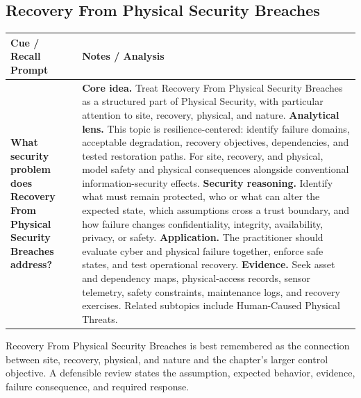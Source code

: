 \documentclass[11pt]{article}
\newcommand{\CornellHeader}{%
\rowcolor{Navy}\color{white}\bfseries Cue / Recall Prompt & \color{white}\bfseries Notes / Analysis\\\hline}
\newcommand{\CornellRow}[2]{%
\cellcolor{CueGray}\RaggedRight\textbf{#1} & \RaggedRight #2\\\hline}
\begin{document}
\subsection*{Recovery From Physical Security Breaches}
\begin{longtable}{>{\RaggedRight\arraybackslash}p{}|>{\RaggedRight\arraybackslash}p{}}
\CornellHeader
\CornellRow{What security problem does Recovery From Physical Security Breaches address?}{\textbf{Core idea.} Treat Recovery From Physical Security Breaches as a structured part of Physical Security, with particular attention to site, recovery, physical, and nature. \textbf{Analytical lens.} This topic is resilience-centered: identify failure domains, acceptable degradation, recovery objectives, dependencies, and tested restoration paths. For site, recovery, and physical, model safety and physical consequences alongside conventional information-security effects. \textbf{Security reasoning.} Identify what must remain protected, who or what can alter the expected state, which assumptions cross a trust boundary, and how failure changes confidentiality, integrity, availability, privacy, or safety. \textbf{Application.} The practitioner should evaluate cyber and physical failure together, enforce safe states, and test operational recovery. \textbf{Evidence.} Seek asset and dependency maps, physical-access records, sensor telemetry, safety constraints, maintenance logs, and recovery exercises. Related subtopics include Human-Caused Physical Threats.}
\end{longtable}
\begin{topicsummary}
Recovery From Physical Security Breaches is best remembered as the connection between site, recovery, physical, and nature and the chapter's larger control objective. A defensible review states the assumption, expected behavior, evidence, failure consequence, and required response.
\end{topicsummary}
\end{document}
